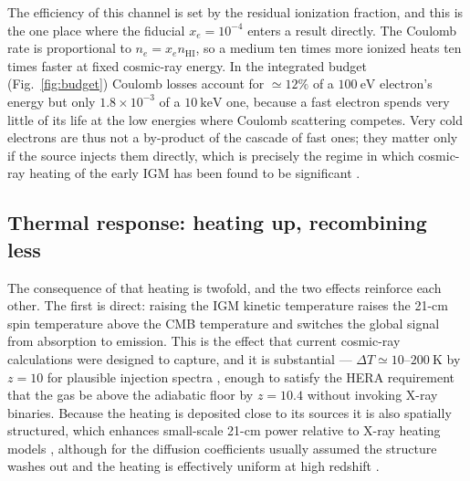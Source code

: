 \documentclass[twocolumn]{article}
\begin{document}
The efficiency of this channel is set by the residual ionization fraction, and
this is the one place where the fiducial $x_e = 10^{-4}$ enters a result
directly. The Coulomb rate is proportional to $n_e = x_e n_{\mathrm{HI}}$, so a
medium ten times more ionized heats ten times faster at fixed cosmic-ray
energy. In the integrated budget (Fig.~\ref{fig:budget}) Coulomb losses account
for $\simeq 12\%$ of a $100\ \mathrm{eV}$ electron's energy but only $1.8\times
10^{-3}$ of a $10\ \mathrm{keV}$ one, because a fast electron spends very
little of its life at the low energies where Coulomb scattering competes. Very
cold electrons are thus not a by-product of the cascade of fast ones; they
matter only if the source injects them directly, which is precisely the
regime in which cosmic-ray heating of the early IGM has been found to be
significant \citep{Sazonov2015,Leite2017}.

\subsection{Thermal response: heating up, recombining less}
\label{sec:heating}

The consequence of that heating is twofold, and the two effects reinforce each
other. The first is direct: raising the IGM kinetic temperature raises the
21-cm spin temperature above the CMB temperature and switches the global signal
from absorption to emission. This is the effect that current cosmic-ray
calculations were designed to capture, and it is substantial ---
$\Delta T \simeq 10$--$200\ \mathrm{K}$ by $z = 10$ for plausible injection
spectra \citep{Leite2017}, enough to satisfy the HERA requirement that the gas
be above the adiabatic floor by $z = 10.4$ \citep{HERA2023} without invoking
X-ray binaries. Because the heating is deposited close to its sources it is
also spatially structured, which enhances small-scale 21-cm power relative to
X-ray heating models \citep{GesseyJones2023}, although for the diffusion
coefficients usually assumed the structure washes out and the heating is
effectively uniform at high redshift \citep{Jana2018}.
\end{document}
